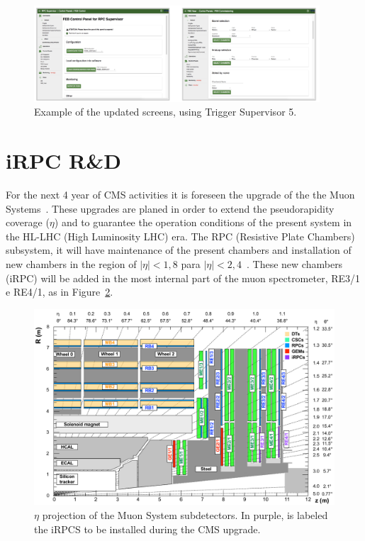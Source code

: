 \begin{figure}[h]
\begin{center}
\includegraphics[width=0.95\textwidth,keepaspectratio]{figures/rpc/ts_view.png}
\end{center}
\caption{Example of the updated screens, using Trigger Supervisor 5.}\label{ts_view}
\end{figure}


\section{iRPC R\&D}

For the next 4 year of CMS activities it is foreseen  the upgrade of the the Muon Systems~\cite{muon_tdr}. These upgrades are planed in order to extend the pseudorapidity coverage ($\eta$) and to guarantee the operation conditions of the present system in the HL-LHC (High Luminosity LHC) era. The RPC (Resistive Plate Chambers)~\cite{muon_tdr} subsystem, it will have maintenance of the present chambers and installation of new chambers in the region of $|\eta| < 1,8$ para $|\eta| < 2,4$~\cite{pedrazamorales2018rpc}. These new chambers (iRPC) will be added in the most internal part of the muon spectrometer, RE3/1 e RE4/1, as in Figure~\ref{muons_eta}.

\begin{figure}[h]
\begin{center}
\includegraphics[width=1.0\textwidth,keepaspectratio]{figures/rpc/muon_eta.png}
\end{center}
\caption{$\eta$ projection of the Muon System subdetectors. In purple, is labeled the iRPCS to be installed during the CMS upgrade.}\label{muons_eta}
\end{figure}

